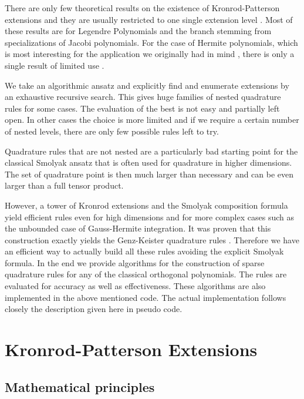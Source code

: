 \documentclass[a4paper,10pt]{article}
\begin{document}
There are only few theoretical results on the existence of Kronrod-Patterson
extensions and they are usually restricted to one single extension level
\cite{gautschi-notaris, gautschi, monegato1978, monegato1978_2, szegoe}.
Most of these results are for Legendre Polynomials and the branch stemming
from specializations of Jacobi polynomials. For the case of Hermite polynomials,
which is most interesting for the application we originally had in mind \cite{H_ladder_operators,
FGL_semiclassical_dynamics}, there is only a single result of limited use \cite{kahaner-monegato}.

We take an algorithmic ansatz and explicitly find and enumerate extensions by
an exhaustive recursive search. This gives huge families of nested quadrature
rules for some cases. The evaluation of the best is not easy and partially
left open. In other cases the choice is more limited and if we require a certain
number of nested levels, there are only few possible rules left to try.

Quadrature rules that are not nested are a particularly bad starting point
for the classical Smolyak ansatz that is often used for quadrature in higher
dimensions. The set of quadrature point is then much larger than necessary
and can be even larger than a full tensor product.

However, a tower of Kronrod extensions and the Smolyak composition formula
yield efficient rules even for high dimensions and for more complex cases such
as the unbounded case of Gauss-Hermite integration. It was proven \cite{novak_ritter}
that this construction exactly yields the Genz-Keister quadrature rules \cite{genz}.
Therefore we have an efficient way to actually build all these rules avoiding
the explicit Smolyak formula. In the end we provide algorithms for the construction
of sparse quadrature rules for any of the classical orthogonal polynomials.
The rules are evaluated for accuracy as well as effectiveness. These algorithms
are also implemented in the above mentioned code. The actual implementation follows
closely the description given here in pseudo code.


\section{Kronrod-Patterson Extensions}

\subsection{Mathematical principles}
\end{document}
